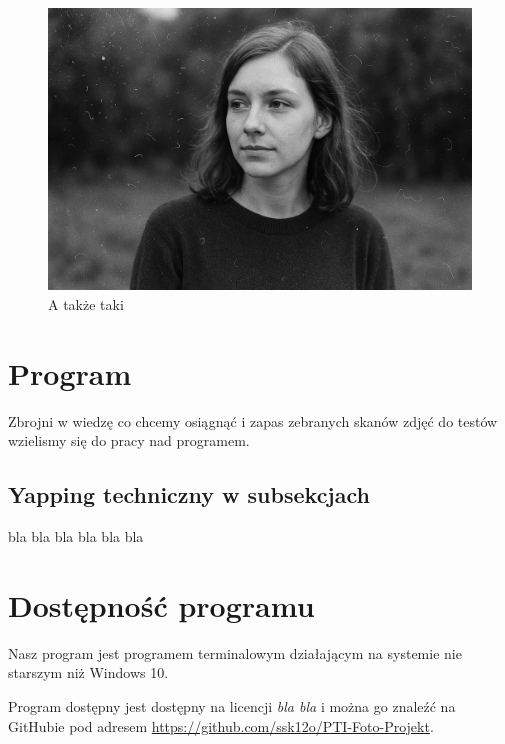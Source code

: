 \documentclass[]{mwart}
\begin{document}
\begin{figure}[H]
    \centering
    \includegraphics[width=\linewidth, keepaspectratio]{p_1.jpg}
    \caption{A także taki}
\end{figure}


\section{Program}
Zbrojni w wiedzę co chcemy osiągnąć i zapas zebranych skanów zdjęć do testów wzielismy się do pracy
nad programem.

\subsection{Yapping techniczny w subsekcjach}
bla bla bla bla bla bla






\section{Dostępność programu}
Nasz program jest programem terminalowym działającym na systemie nie starszym niż Windows 10.

Program dostępny jest dostępny na licencji \textit{bla bla} i można go znaleźć na GitHubie
pod adresem \url{https://github.com/ssk12o/PTI-Foto-Projekt}.




\newpage
\end{document}
